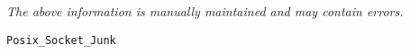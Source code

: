 \label{pkg:posix\_socket\_junk}

{\tiny \it The above information is manually maintained and may contain errors.}
\begin{verbatim}
Posix_Socket_Junk
\end{verbatim}
